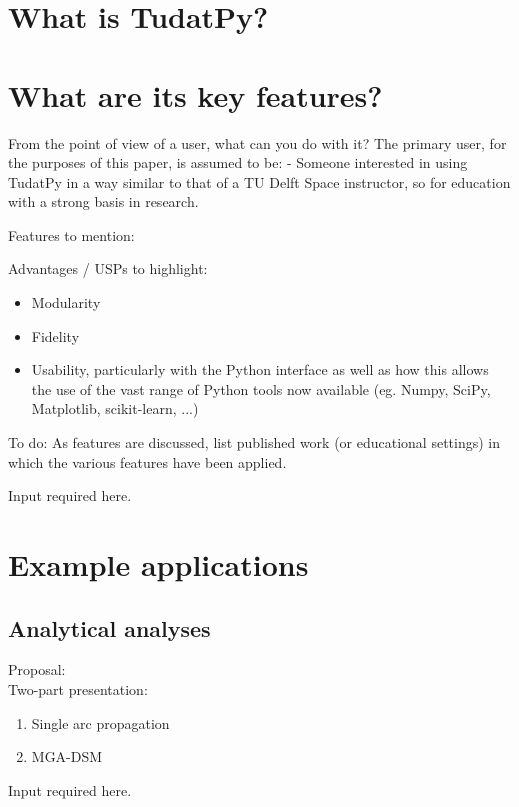 \documentclass[]{IAC_style_updated}
\begin{document}
\section{What is TudatPy?}
    

\section{What are its key features?}
    

    From the point of view of a user, what can you do with it?
    The primary user, for the purposes of this paper, is assumed to be:
    - Someone interested in using TudatPy in a way similar to that of a TU Delft Space instructor, so for education with a strong basis in research.

    Features to mention:

    Advantages / USPs to highlight:
    \begin{itemize}
        \item Modularity
        \item Fidelity
        \item Usability, particularly with the Python interface as well as how this allows the use of the vast range of Python tools now available (eg. Numpy, SciPy, Matplotlib, scikit-learn, ...)
    \end{itemize}

    To do:
    \lbrack \rbrack As features are discussed, list published work (or educational settings) in which the various features have been applied.

    \lbrack Input required here.\rbrack

\section{Example applications}
    

    \subsection{Analytical analyses}
    
    Proposal: \\
    Two-part presentation: 
    \begin{enumerate}
        \item Single arc propagation
        \item MGA-DSM
    \end{enumerate}
    \lbrack Input required here.\rbrack
\end{document}
